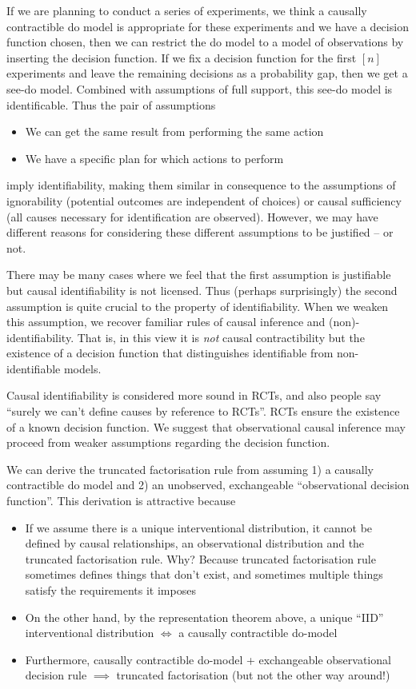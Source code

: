 If we are planning to conduct a series of experiments, we think a causally contractible do model is appropriate for these experiments and we have a decision function chosen, then we can restrict the do model to a model of observations by inserting the decision function. If we fix a decision function for the first $[n]$ experiments and leave the remaining decisions as a probability gap, then we get a see-do model. Combined with assumptions of full support, this see-do model is identificable. Thus the pair of assumptions
\begin{itemize}
    \item We can get the same result from performing the same action
    \item We have a specific plan for which actions to perform
\end{itemize}
imply identifiability, making them similar in consequence to the assumptions of ignorability (potential outcomes are independent of choices) or causal sufficiency (all causes necessary for identification are observed). However, we may have different reasons for considering these different assumptions to be justified -- or not.

There may be many cases where we feel that the first assumption is justifiable but causal identifiability is not licensed. Thus (perhaps surprisingly) the second assumption is quite crucial to the property of identifiability. When we weaken this assumption, we recover familiar rules of causal inference and (non)-identifiability. That is, in this view it is \emph{not} causal contractibility but the existence of a decision function that distinguishes identifiable from non-identifiable models.

Causal identifiability is considered more sound in RCTs, and also people say ``surely we can't define causes by reference to RCTs''. RCTs ensure the existence of a known decision function. We suggest that observational causal inference may proceed from weaker assumptions regarding the decision function.





We can derive the truncated factorisation rule from assuming 1) a causally contractible do model and 2) an unobserved, exchangeable ``observational decision function''. This derivation is attractive because
\begin{itemize}
    \item If we assume there is a unique interventional distribution, it cannot be defined by causal relationships, an observational distribution and the truncated factorisation rule. Why? Because truncated factorisation rule sometimes defines things that don't exist, and sometimes multiple things satisfy the requirements it imposes
    \item On the other hand, by the representation theorem above, a unique ``IID'' interventional distribution $\iff$ a causally contractible do-model
    \item Furthermore, causally contractible do-model + exchangeable observational decision rule $\implies$ truncated factorisation (but not the other way around!)
\end{itemize}

